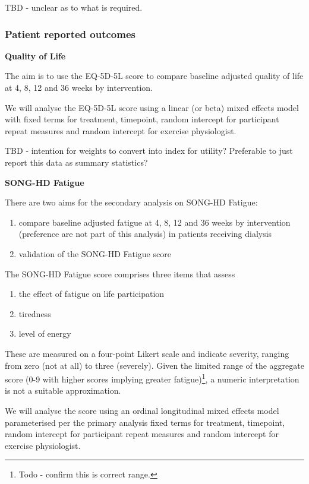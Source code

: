 \documentclass[
]{article}
\begin{document}
TBD - unclear as to what is required.



\hypertarget{patient-reported-outcomes}{%
  \subsubsection{Patient reported outcomes}\label{patient-reported-outcomes}}


\textbf{Quality of Life}

The aim is to use the EQ-5D-5L score to compare baseline adjusted quality of life at 4, 8, 12 and 36 weeks by intervention.

We will analyse the EQ-5D-5L score using a linear (or beta) mixed effects model with fixed terms for treatment, timepoint, random intercept for participant repeat measures and random intercept for exercise physiologist.

TBD - intention for weights to convert into index for utility? Preferable to just report this data as summary statistics?


\textbf{SONG-HD Fatigue}

There are two aims for the secondary analysis on SONG-HD Fatigue:

\begin{enumerate}
  \item compare baseline adjusted fatigue at 4, 8, 12 and 36 weeks by intervention (preference are not part of this analysis) in patients receiving dialysis
  \item validation of the SONG-HD Fatigue score
\end{enumerate}

The SONG-HD Fatigue score comprises three items that assess
\begin{enumerate}
  \item the effect of fatigue on life participation
  \item tiredness
  \item level of energy
\end{enumerate}

These are measured on a four-point Likert scale and indicate severity, ranging from zero (not at all) to three (severely).
Given the limited range of the aggregate score (0-9 with higher scores implying greater fatigue)\footnote{Todo - confirm this is correct range.}, a numeric interpretation is not a suitable approximation.

We will analyse the score using an ordinal longitudinal mixed effects model parameterised per the primary analysis fixed terms for treatment, timepoint, random intercept for participant repeat measures and random intercept for exercise physiologist.
\end{document}
